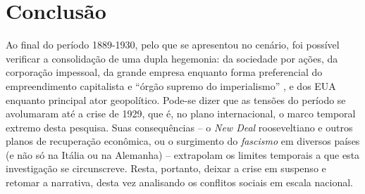 \section{Conclusão}\label{sec:1.5}

Ao final do período 1889-1930, pelo que se apresentou no cenário, foi possível verificar a consolidação de uma dupla hegemonia: da sociedade por ações, da corporação impessoal, da grande empresa enquanto forma preferencial do empreendimento capitalista e ``órgão supremo do imperialismo'' \cite{PEDROSA1966a}, e dos EUA enquanto principal ator geopolítico. Pode-se dizer que as tensões do período se avolumaram até a crise de 1929, que é, no plano internacional, o marco temporal extremo desta pesquisa. Suas consequências -- o \textit{New Deal} rooseveltiano e outros planos de recuperação econômica, ou o surgimento do \textit{fascismo} em diversos países (e não só na Itália ou na Alemanha) -- extrapolam os limites temporais a que esta investigação se circunscreve. Resta, portanto, deixar a crise em suspenso e retomar a narrativa, desta vez analisando os conflitos sociais em escala nacional.